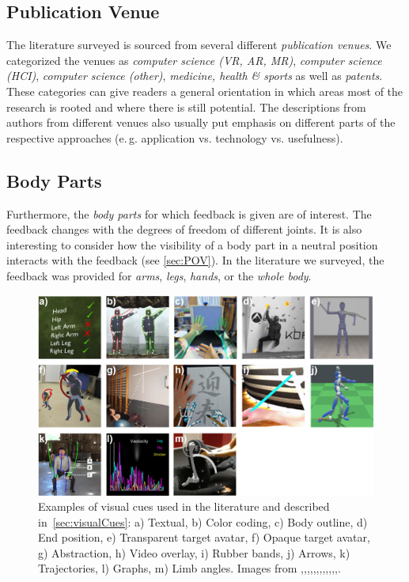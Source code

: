 \subsection*{Publication Venue}
The literature surveyed is sourced from several different \emph{publication venues}. We categorized the venues as \emph{computer science (VR, AR, MR)}, \textit{computer science (HCI)}, \emph{computer science (other)}, \emph{medicine, health \& sports} as well as \emph{patents}. These categories can give readers a general orientation in which areas most of the research is rooted and where there is still potential. The descriptions from authors from different venues also usually put emphasis on different parts of the respective approaches (e.\,g. application vs. technology vs. usefulness).

\subsection*{Body Parts}
Furthermore, the \textit{body parts} for which feedback is given are of interest. The feedback changes with the degrees of freedom of different joints. It is also interesting to consider how the visibility of a body part in a neutral position interacts with the feedback (see \autoref{sec:POV}). In the literature we surveyed, the feedback was provided for \textit{arms}, \textit{legs}, \textit{hands}, or the \textit{whole body}.

\begin{figure}[tb]
    \centering
    \includegraphics[width=1\linewidth]{pictures/CueMatrix.PNG}
    \caption{Examples of visual cues used in the literature and described in~\autoref{sec:visualCues}: a) Textual, b) Color coding, c) Body outline, d) End position, e) Transparent target avatar, f) Opaque target avatar, g) Abstraction, h) Video overlay, i) Rubber bands, j) Arrows, k) Trajectories, l) Graphs, m) Limb angles.  Images from \cite{caserman2021fbm},\cite{quevedo2017asr},\cite{han2016ara},\cite{wiehr2016bce},\cite{waltemate2016tlp},\cite{ikeda2018arb},\cite{vidal2020blo},\cite{furukawa2018dar},\cite{yu2020pmd},\cite{oshita2018sts},\cite{clarke2020rva},\cite{takahashi2019vrb},\cite{debarba2018arv}. \label{fig:CueMatrix}}
\end{figure}

